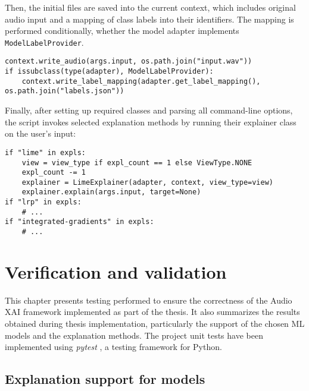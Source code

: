 \documentclass[
    bindingoffset=5mm,  %
    footnoteindent=3mm, %
    hyphenation=true    %
]{src/wut-thesis}
\begin{document}
Then, the initial files are saved into the current context, which includes original audio input
and a mapping of class labels into their identifiers. The mapping is performed conditionally,
whether the model adapter implements \texttt{ModelLabelProvider}.

\begin{verbatim}
context.write_audio(args.input, os.path.join("input.wav"))
if issubclass(type(adapter), ModelLabelProvider):
    context.write_label_mapping(adapter.get_label_mapping(), os.path.join("labels.json"))
\end{verbatim}

Finally, after setting up required classes and parsing all command-line options,
the script invokes selected explanation methods by running their
explainer class on the user’s input:

\begin{verbatim}
if "lime" in expls:
    view = view_type if expl_count == 1 else ViewType.NONE
    expl_count -= 1
    explainer = LimeExplainer(adapter, context, view_type=view)
    explainer.explain(args.input, target=None)
if "lrp" in expls:
    # ...
if "integrated-gradients" in expls:
    # ...
\end{verbatim}

%
%
\clearpage %
\section{Verification and validation} \label{ch:verification}

This chapter presents testing performed to ensure the correctness of the Audio XAI framework
implemented as part of the thesis. It also summarizes the results obtained during thesis implementation,
particularly the support of the chosen ML models and the explanation methods.
The project unit tests have been implemented using \emph{pytest} \cite{PytestDoc}, a testing framework for Python.

\subsection{Explanation support for models} \label{ch6:ExplanationSupport}
\end{document}
